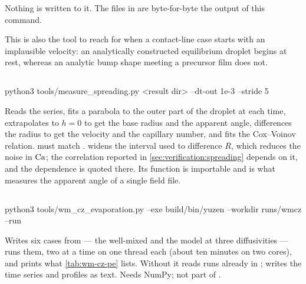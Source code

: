 Nothing is written to it. The files in  are byte-for-byte the
output of this command.

This is also the tool to reach for when a contact-line case starts with an
implausible velocity: an analytically constructed equilibrium droplet begins at
rest, whereas an analytic bump shape meeting a precursor film does not.

\subsection{}

\begin{shell}
python3 tools/measure_spreading.py <result dir> --dt-out 1e-3 --stride 5
\end{shell}

Reads the  series, fits a parabola to the outer part of the
droplet at each time, extrapolates to $h = 0$ to get the base radius and the
apparent angle, differences the radius to get the velocity and the capillary
number, and fits the Cox--Voinov relation.  must match
.  widens the interval used
to difference $R$, which reduces the noise in $\mathrm{Ca}$; the correlation reported
in \cref{sec:verification:spreading} depends on it, and the dependence is
quoted there. Its  function is importable and is what measures
the apparent angle of a single field file.

\subsection{}

\begin{shell}
python3 tools/wm_cz_evaporation.py --exe build/bin/yuzen --workdir runs/wmcz --run
\end{shell}

Writes six cases from  --- the well-mixed and
the  model at three diffusivities --- runs them, two at a time on one
thread each (about ten minutes on two cores), and prints what
\cref{tab:wm-cz-pe} lists. Without  it reads runs already in
;  writes the time series and profiles as text.
Needs NumPy; not part of .

\subsection{}

